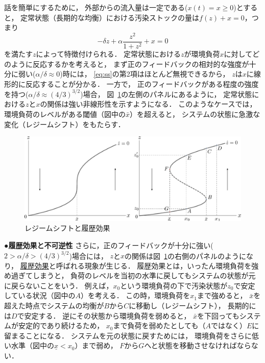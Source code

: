 \documentclass[11pt,a4paper]{article}
\renewcommand{\figurename}{図}
\begin{document}
話を簡単にするために，
外部からの流入量は一定である($x(t)=x\geq 0$)とすると，
定常状態（長期的な均衡）における汚染ストックの量は$f(z)+x = 0$，つまり
\begin{equation}\label{eq:ss}%
  -\delta z + \alpha\frac{z^{2}}{1+z^{2}} + x = 0
\end{equation}
を満たす$z$によって特徴付けられる．
定常状態における$z$が環境負荷$x$に対してどのように反応するかを考えると，
まず正のフィードバックの相対的な強度が十分に弱い($\alpha/\delta\approx 0$)時には，
\eqref{eq:ss}の第2項はほとんど無視できるから，
$z$は$x$に線形的に反応することが分かる．
一方で，
正のフィードバックがある程度の強度を持つ($\alpha/\delta\approx (4/3)^{3/2}$)場合，
\figurename~\ref{fig:nonconvex_lake}の左側のパネルにあるように， 
定常状態における$z$と$x$の関係は強い非線形性を示すようになる．
このようなケースでは，環境負荷のレベルがある閾値（図中の$\bar{x}$）を超えると，
システムの状態に急激な変化（レジームシフト）をもたらす．
%
\begin{figure}[t]\centering%
  \includegraphics[width=380pt]{figures/fig_nonconvex_lake_b.eps}
\caption{レジームシフトと履歴効果}
\label{fig:nonconvex_lake}
\end{figure}

\noindent\textbf{●履歴効果と不可逆性}\hspace{0.5em}
さらに，正のフィードバックが十分に強い($2>\alpha/\delta> (4/3)^{3/2}$)場合には， 
$z$と$x$の関係は\figurename~\ref{fig:nonconvex_lake}の右側のパネルのようになり，
\underline{履歴効果}と呼ばれる現象が生じる．
履歴効果とは，いったん環境負荷を強め過ぎてしまうと，
負荷のレベルを当初の水準に戻してもシステムの状態が元に戻らないことをいう．
例えば，$x_{0}$という環境負荷の下で汚染状態が$z_{0}$で安定している状況（図中の$A$）を考える．
この時，環境負荷を$x_{1}$まで強めると，
$\bar{x}$を超えた時点でシステムの均衡が$B$から$C$に移動し（レジームシフト），
長期的には$D$で安定する．
逆にその状態から環境負荷を弱めると，
$\bar{x}$を下回ってもシステムが安定的であり続けるため，
$x_{0}$まで負荷を弱めたとしても（$A$ではなく）$E$に留まることになる．
システムを元の状態に戻すためには，
環境負荷をさらに低い水準（図中の$\underline{x}<x_{0}$）まで弱め，
$F$から$G$へと状態を移動させなければならない．
\end{document}
